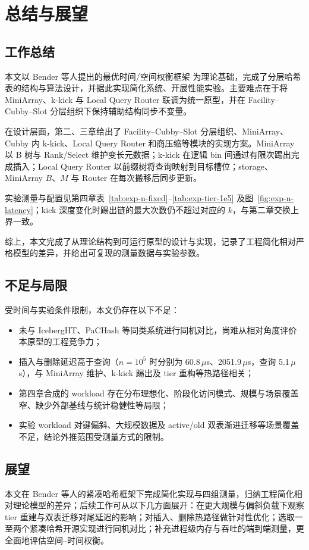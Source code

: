 \chapter{总结与展望}
\label{ch:concl}

\section{工作总结}

本文以 Bender 等人提出的最优时间/空间权衡框架\cite{bender2022otsh} 为理论基础，完成了分层哈希表的结构与算法设计，并据此实现简化系统、开展性能实验。主要难点在于将 MiniArray、k-kick 与 Local Query Router 联调为统一原型，并在 Facility--Cubby--Slot 分层组织下保持辅助结构同步不变量。

在设计层面，第二、三章给出了 Facility--Cubby--Slot 分层组织、MiniArray、Cubby 内 k-kick、Local Query Router 和商压缩等模块的实现方案。MiniArray 以 B 树与 Rank/Select 维护变长元数据；k-kick 在逻辑 bin 间通过有限次踢出完成插入；Local Query Router 以前缀树将查询映射到目标槽位；storage、MiniArray \(B\)、\(M\) 与 Router 在每次搬移后同步更新。

实验测量与配置见第四章表~\ref{tab:exp-n-fixed}--\ref{tab:exp-tier-1e5} 及图~\ref{fig:exp-n-latency}；kick 深度变化时踢出链的最大次数仍不超过对应的 \(k\)，与第二章交换上界一致。

综上，本文完成了从理论结构到可运行原型的设计与实现，记录了工程简化相对严格模型的差异，并给出可复现的测量数据与实验参数。

\section{不足与局限}

受时间与实验条件限制，本文仍存在以下不足：
\begin{itemize}
  \item 未与 IcebergHT\cite{pandey2023iceberght}、PaCHash\cite{kurpicz2023pachash} 等同类系统进行同机对比，尚难从相对角度评价本原型的工程竞争力；
  \item 插入与删除延迟高于查询（\(n=10^5\) 时分别为 60.8\,$\mu$s、2051.9\,$\mu$s，查询 5.1\,$\mu$s），与 MiniArray 维护、k-kick 踢出及 tier 重构等热路径相关；
  \item 第四章合成的 workload 存在分布理想化、阶段化访问模式、规模与场景覆盖窄、缺少外部基线与统计稳健性等局限；
  \item 实验 workload 对键偏斜、大规模数据及 active/old 双表渐进迁移等场景覆盖不足，结论外推范围受测量方式的限制。
\end{itemize}

\section{展望}

本文在 Bender 等人的紧凑哈希框架下完成简化实现与四组测量，归纳工程简化相对理论模型的差异；后续工作可从以下几方面展开：在更大规模与偏斜负载下观察 tier 重建与双表迁移对尾延迟的影响；对插入、删除热路径做针对性优化；选取一至两个紧凑哈希开源实现进行同机对比；补充进程级内存与吞吐的端到端测量，更全面地评估空间--时间权衡\cite{kurpicz2023pachash,lehmann2026mphsurvey}。
